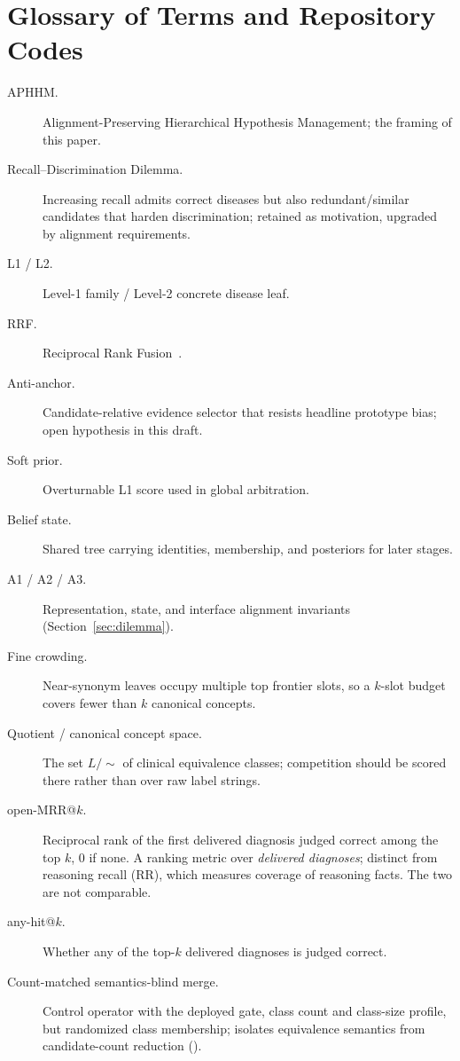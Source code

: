 \appendix

\section{Glossary of Terms and Repository Codes}
\label{app:glossary}

\begin{description}
  \item[APHHM.] Alignment-Preserving Hierarchical Hypothesis Management; the framing of this paper.
  \item[Recall--Discrimination Dilemma.] Increasing recall admits correct diseases but also redundant/similar candidates that harden discrimination; retained as motivation, upgraded by alignment requirements.
  \item[L1 / L2.] Level-1 family / Level-2 concrete disease leaf.
  \item[RRF.] Reciprocal Rank Fusion~\cite{rrf2009}.
  \item[Anti-anchor.] Candidate-relative evidence selector that resists headline prototype bias; open hypothesis in this draft.
  \item[Soft prior.] Overturnable L1 score used in global arbitration.
  \item[Belief state.] Shared tree carrying identities, membership, and posteriors for later stages.
  \item[A1 / A2 / A3.] Representation, state, and interface alignment invariants (Section~\ref{sec:dilemma}).
  \item[Fine crowding.] Near-synonym leaves occupy multiple top frontier slots, so a $k$-slot budget covers fewer than $k$ canonical concepts.
  \item[Quotient / canonical concept space.] The set $L/\!\sim$ of clinical equivalence classes; competition should be scored there rather than over raw label strings.
  \item[open-MRR@$k$.] Reciprocal rank of the first delivered diagnosis judged correct among the top $k$, $0$ if none. A ranking metric over \emph{delivered diagnoses}; distinct from reasoning recall (RR), which measures coverage of reasoning facts. The two are not comparable.
  \item[any-hit@$k$.] Whether any of the top-$k$ delivered diagnoses is judged correct.
  \item[Count-matched semantics-blind merge.] Control operator with the deployed gate, class count and class-size profile, but randomized class membership; isolates equivalence semantics from candidate-count reduction ().

\end{description}
